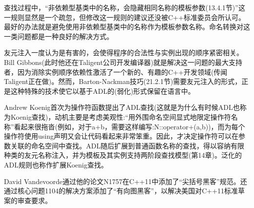 查找过程中，“非依赖型基类中的名称，会隐藏相同名称的模板参数(13.4.1节)”这一规则显然是一个疏忽，但修改这一规则的建议还没被C++标准委员会所认可。最好的办法就是避免使用非依赖型基类中的名称作为模板参数名称。命名转换对这一类问题都是一种良好的解决方式。

友元注入一度认为是有害的，会使得程序的合法性与实例出现的顺序紧密相关。Bill Gibbons(此时他还在Taligent公司开发编译器)就是解决这一问题的最大支持者，因为消除实例顺序依赖性激活了一个新的、有趣的C++开发领域(传闻Taligent正在做)。然而，Barton-Nackman技巧(21.2.1节)需要友元注入的形式，正是这种特殊的技术使它以基于ADL的(弱化)形式保留在语言中。

Andrew Koenig首次为操作符函数提出了ADL查找(这就是为什么有时候ADL也称为Koenig查找)，动机主要是考虑美观性:“用外围命名空间显式地限定操作符名称”看起来很拖沓(例如，对于a+b，需要这样编写:N::operator+(a,b))，而为每个操作符使用using声明又会让代码看起来非常笨重。因此，才决定操作符可以在参数关联的命名空间中查找。ADL随后扩展到普通函数名称的查找，得以容纳有限种类的友元名称注入，并为模板及其实例支持两阶段查找模型(第14章)。泛化的ADL规则也称作扩展Koenig查找。

David Vandevoorde通过他的论文N1757在C++11中添加了“尖括号黑客”规范。还通过核心问题1104的解决方案添加了“有向图黑客”，以解决美国对C++11标准草案的审查要求。